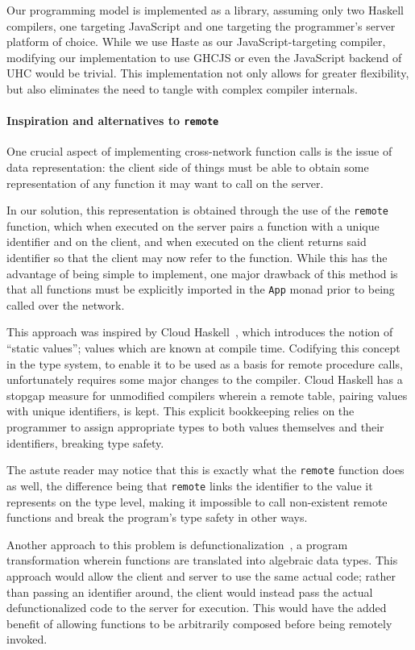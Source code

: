 \documentclass[preprint]{sigplanconf}
\begin{document}
Our programming model is implemented as a library, assuming only two Haskell
compilers, one targeting JavaScript and one targeting the programmer's server
platform of choice. While we use Haste as our JavaScript-targeting compiler,
modifying our implementation to use GHCJS or even the JavaScript backend of UHC
would be trivial. This implementation not only allows for greater flexibility,
but also eliminates the need to tangle with complex compiler internals.

\paragraph{Inspiration and alternatives to \lstinline!remote!}
\label{sec:cloudhaskell}
One crucial aspect of implementing cross-network function calls is the issue of
data representation: the client side of things must be able to obtain some
representation of any function it may want to call on the server.

In our solution, this representation is obtained through the use of the \lstinline!remote! function, which when executed on the server pairs a function with a
unique identifier and on the client, and when executed on the client returns
said identifier so that the client may now refer to the function. While this
has the advantage of being simple to implement, one major drawback of this
method is that all functions must be explicitly imported in the \lstinline!App!
monad prior to being called over the network.

This approach was inspired by Cloud Haskell\ \cite{cloudhaskell}, which
introduces the notion of ``static values''; values which are known at compile
time. Codifying this concept in the type system, to enable it to be used as a
basis for remote procedure calls, unfortunately requires some major changes to
the compiler. Cloud Haskell has a stopgap measure for unmodified compilers
wherein a remote table, pairing values with unique identifiers, is kept.
This explicit bookkeeping relies on the programmer to assign appropriate types
to both values themselves and their identifiers, breaking type safety.

The astute reader may notice that this is exactly what the \lstinline!remote!
function does as well, the difference being that \lstinline!remote! links the
identifier to the value it represents on the type level, making it impossible
to call non-existent remote functions and break the program's type safety in
other ways.

Another approach to this problem is
defunctionalization\ \cite{defunctionalization}, a program transformation
wherein functions are translated into algebraic data types. This approach would
allow the client and server to use the same actual code; rather than passing
an identifier around, the client would instead pass the actual defunctionalized
code to the server for execution. This would have the added benefit of allowing
functions to be arbitrarily composed before being remotely invoked.
\end{document}
